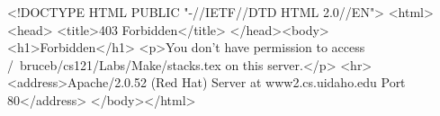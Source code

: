 <!DOCTYPE HTML PUBLIC "-//IETF//DTD HTML 2.0//EN">
<html><head>
<title>403 Forbidden</title>
</head><body>
<h1>Forbidden</h1>
<p>You don't have permission to access /~bruceb/cs121/Labs/Make/stacks.tex
on this server.</p>
<hr>
<address>Apache/2.0.52 (Red Hat) Server at www2.cs.uidaho.edu Port 80</address>
</body></html>
